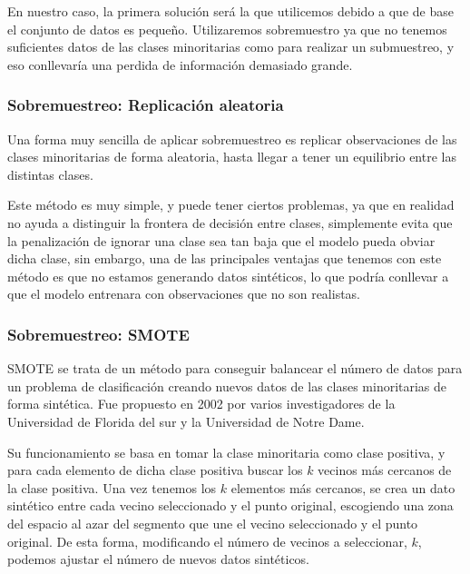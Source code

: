 En nuestro caso, la primera solución será la que utilicemos debido a que de base el conjunto de datos es pequeño. Utilizaremos sobremuestro ya que no tenemos suficientes datos de las clases minoritarias como para realizar un submuestreo, y eso conllevaría una perdida de información demasiado grande.

\newpage

\subsubsection{Sobremuestreo: Replicación aleatoria}

Una forma muy sencilla de aplicar sobremuestreo es replicar observaciones de las clases minoritarias de forma aleatoria, hasta llegar a tener un equilibrio entre las distintas clases.

Este método es muy simple, y puede tener ciertos problemas, ya que en realidad no ayuda a distinguir la frontera de decisión entre clases, simplemente evita que la penalización de ignorar una clase sea tan baja que el modelo pueda obviar dicha clase, sin embargo, una de las principales ventajas que tenemos con este método es que no estamos generando datos sintéticos, lo que podría conllevar a que el modelo entrenara con observaciones que no son realistas.

\subsubsection{Sobremuestreo: SMOTE}

SMOTE \cite{SMOTE} se trata de un método para conseguir balancear el número de datos para un problema de clasificación creando nuevos datos de las clases minoritarias de forma sintética. Fue propuesto en 2002 por varios investigadores de la Universidad de Florida del sur y la Universidad de Notre Dame.

Su funcionamiento se basa en tomar la clase minoritaria como clase positiva, y para cada elemento de dicha clase positiva buscar los $k$ vecinos más cercanos de la clase positiva. Una vez tenemos los $k$ elementos más cercanos, se crea un dato sintético entre cada vecino seleccionado y el punto original, escogiendo una zona del espacio al azar del segmento que une el vecino seleccionado y el punto original. De esta forma, modificando el número de vecinos a seleccionar, $k$, podemos ajustar el número de nuevos datos sintéticos.


